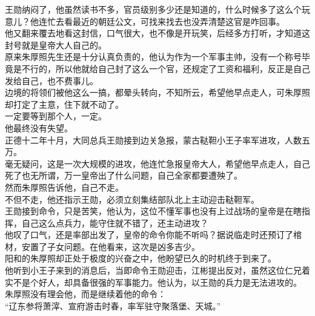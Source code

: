 \begin{multicols}{\theparacolNo}
王勋纳闷了，他虽然读书不多，官员级别多少还是知道的，什么时候多了这么个玩意儿？他连忙去看最近的朝廷公文，可找来找去也没弄清楚这官是咋回事。\\

他又翻来覆去地看这封信，口气很大，也不像是开玩笑，后经多方打听，才知道这封号就是皇帝大人自己的。\\

原来朱厚照先生还是十分认真负责的，他认为作为一个军事主帅，没有一个称号毕竟是不行的，所以他就给自己封了这么一个官，还规定了工资和福利，反正是自己发给自己，也不费事儿。\\

边境的将领们被他这么一搞，都晕头转向，不知所云，希望他早点走人，可朱厚照却打定了主意，住下就不动了。\\

一定要等到那个人，一定。\\

他最终没有失望。\\

正德十二年十月，大同总兵王勋接到边关急报，蒙古鞑靼小王子率军进攻，人数五万。\\

毫无疑问，这是一次大规模的进攻，他连忙急报皇帝大人，希望他早点走人，自己死了也无所谓，万一皇帝出了什么问题，自己全家都要遭殃了。\\

然而朱厚照告诉他，自己不走。\\

不但不走，他还指示王勋，必须立刻集结部队北上主动迎击鞑靼军。\\

王勋接到命令，只是苦笑，他认为，这位不懂军事也没有上过战场的皇帝是在瞎指挥，自己这么点兵力，能守住就不错了，还主动进攻？\\

他叹了口气，还是率部出发了，皇帝的命令你能不听吗？据说临走时还预订了棺材，安置了子女问题。在他看来，这次是凶多吉少。\\

阳和的朱厚照却正处于极度的兴奋之中，他盼望已久的时机终于到来了。\\

他听到小王子来到的消息后，当即命令王勋迎击，江彬提出反对，虽然这位仁兄着实不是个好人，却具备很强的军事能力。他认为，以王勋的兵力是无法进攻的。\\

朱厚照没有理会他，而是继续着他的命令：\\

“辽东参将萧滓、宣府游击时春，率军驻守聚落堡、天城。”\\


\end{multicols}
